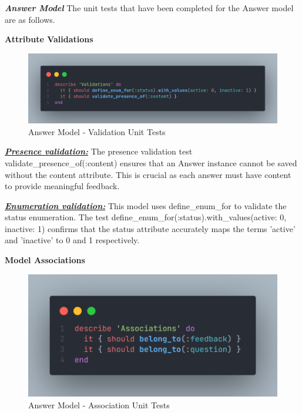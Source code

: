 \begin{justify}


\newendline \textbf{\textit{Answer Model}}\newendline
The unit tests that have been completed for the Answer model are as follows.

\vspace{0.25cm}
\newendline
\textbf{Attribute Validations}


    \begin{figure}[H]
        \centerline{\includegraphics[width=140mm,scale=1]{figures/implementation_and_testing/testing/AUT/answer/validations.png}}
        \caption{Answer Model - Validation Unit Tests}
        \label{Answer Model - Validation Unit Tests}
    \end{figure}

\vspace{0.25cm}
\noindent\textbf{\textit{\underline{Presence validation:}}} The presence validation test validate\_presence\_of(:content) ensures that an Answer instance cannot be saved without the content attribute. This is crucial as each answer must have content to provide meaningful feedback.

\vspace{0.25cm}
\noindent\textbf{\textit{\underline{Enumeration validation:}}} This model uses define\_enum\_for to validate the status enumeration. The test define\_enum\_for(:status).with\_values(active: 0, inactive: 1) confirms that the status attribute accurately maps the terms 'active' and 'inactive' to 0 and 1 respectively.

\vspace{0.25cm}
\newendline
\textbf{Model Associations}

    \begin{figure}[H]
        \centerline{\includegraphics[width=140mm,scale=1]{figures/implementation_and_testing/testing/AUT/answer/associations.png}}
        \caption{Answer Model - Association Unit Tests}
        \label{Answer Model - Association Unit Tests}
    \end{figure}


\end{justify}
